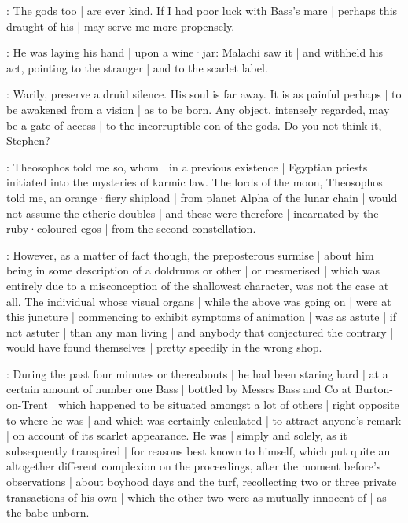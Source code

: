 \lenehan:
The gods too |
are ever kind.
If I had poor luck with Bass's mare |
perhaps this draught of his |
may serve me more propensely.

:
He was laying his hand |
upon a wine·jar:
Malachi saw it |
and withheld his act,
pointing to the stranger |
and to the scarlet label.

\mulligan:
 Warily,
preserve a druid silence.
His soul is far away.
It is as painful perhaps |
to be awakened from a vision |
as to be born.
Any object,
intensely regarded,
may be a gate of access |
to the incorruptible eon of the gods.
Do you not think it,
Stephen?

\stephen:
Theosophos told me so,
whom |
in a previous existence |
Egyptian priests initiated into the mysteries of karmic law.
The lords of the moon,
Theosophos told me,
an orange·fiery shipload |
from planet Alpha of the lunar chain |
would not assume the etheric doubles |
and these were therefore |
incarnated by the ruby·coloured egos |
from the second constellation.



:
However,
as a matter of fact though,
the preposterous surmise |
about him being in some description of a doldrums or other |
or mesmerised |
which was entirely due to a misconception of the shallowest character,
was not the case at all.
The individual whose visual organs |
while the above was going on |
were at this juncture |
commencing to exhibit symptoms of animation |
was as astute |
if not astuter |
than any man living |
and anybody that conjectured the contrary |
would have found themselves |
pretty speedily in the wrong shop.

:
During the past four minutes or thereabouts |
he had been staring hard |
at a certain amount of number one Bass |
bottled by Messrs Bass and Co at Burton-on-Trent |
which happened to be situated amongst a lot of others |
right opposite to where he was |
and which was certainly calculated |
to attract anyone's remark |
on account of its scarlet appearance.
He was |
simply and solely,
as it subsequently transpired |
for reasons best known to himself,
which put quite an altogether different complexion on the proceedings,
after the moment before's observations |
about boyhood days and the turf,
recollecting two or three private transactions of his own |
which the other two were as mutually innocent of |
as the babe unborn.

